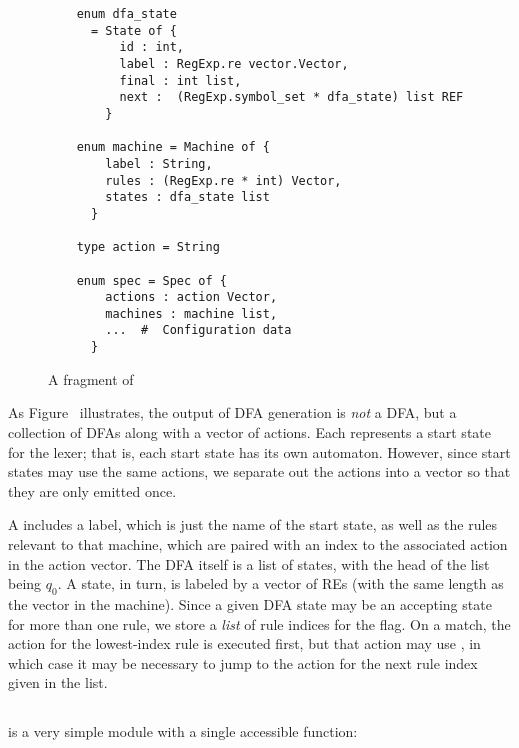 \begin{figure}
\begin{verbatim}
    enum dfa_state
      = State of {
          id : int,
          label : RegExp.re vector.Vector,
          final : int list,
          next :  (RegExp.symbol_set * dfa_state) list REF
        }

    enum machine = Machine of {
        label : String,
        rules : (RegExp.re * int) Vector,
        states : dfa_state list
      }

    type action = String

    enum spec = Spec of {
        actions : action Vector,
        machines : machine list,
        ...  #  Configuration data 
      }
\end{verbatim}
\caption{A fragment of }\label{fig:lex-output-spec}
\end{figure}

As Figure~ illustrates, the output of DFA generation is
\emph{not} a DFA, but a collection of DFAs along with a vector of actions. 
Each  represents a start state for the lexer; that is, each start
state has its own automaton.  However, since start states may use the same
actions, we separate out the actions into a vector so that they are only
emitted once.

A  includes a label, which is just the name of the start state, as
well as the rules relevant to that machine, which are paired with an index to
the associated action in the action vector.  The DFA itself is a list of
states, with the head of the list being $q_0$.  A state, in turn, is labeled by
a vector of REs (with the same length as the  vector in the machine).
 Since a given DFA state may be an accepting state for more than one rule, we
store a \emph{list} of rule indices for the  flag.  On a match, the
action for the lowest-index rule is executed first, but that action may use
, in which case it may be necessary to jump to the action for the
next rule index given in the  list.

\subsection{}\label{sec:lex-gen}

 is a very simple module with a single accessible function:
\begin{center}
\end{center}

